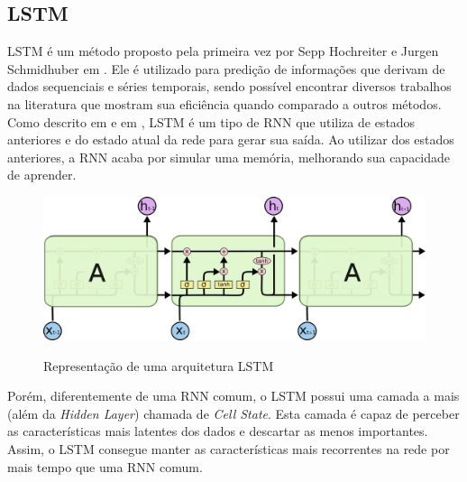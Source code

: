 \subsection{\acrfull{LSTM}}

\acrshort{LSTM} é um método proposto pela primeira vez por Sepp Hochreiter e Jurgen Schmidhuber em \cite{Sepp_1997}. Ele é utilizado para predição de informações que derivam de dados sequenciais e séries temporais, sendo possível encontrar diversos trabalhos na literatura que mostram sua eficiência quando comparado a outros métodos. Como descrito em \cite{Zainab_2018} e em \cite{Xiaolei_2015}, \acrshort{LSTM} é um tipo de \acrshort{RNN} que utiliza de estados anteriores e do estado atual da rede para gerar sua saída. Ao utilizar dos estados anteriores, a \acrshort{RNN} acaba por simular uma memória, melhorando sua capacidade de aprender. 

\begin{figure}[htbp]
    \centering
    \includegraphics[scale=0.4]{monography/img/models/lstm3.png}
    \label{figure:lstm}
    \caption[Representação de uma arquitetura LSTM]{Representação de uma arquitetura LSTM\footnotemark}
\end{figure}


Porém, diferentemente de uma \acrshort{RNN} comum, o LSTM possui uma camada a mais (além da \textit{Hidden Layer}) chamada de \textit{Cell State}. Esta camada é capaz de perceber as características mais latentes dos dados e descartar as menos importantes. Assim, o \acrshort{LSTM} consegue manter as características mais recorrentes na rede por mais tempo que uma \acrshort{RNN} comum. 

